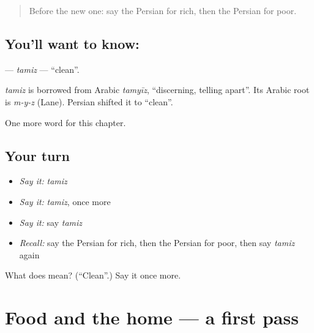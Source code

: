 \label{lesson:FA-C61-tamiz}



\begin{quote}
Before the new one: say the Persian for rich, then the Persian for poor.
\end{quote}

\subsection*{You'll want to know: }
\textbf{} — \emph{tamiz} — \textquotedblleft{}clean\textquotedblright{}.

\begin{cousinweb}
\emph{tamiz} is borrowed from Arabic \emph{tamyīz}, \textquotedblleft{}discerning, telling apart\textquotedblright{}. Its Arabic root is \emph{m-y-z} (Lane). Persian shifted it to \textquotedblleft{}clean\textquotedblright{}.
\end{cousinweb}

\begin{grammarlens}[title={What you've built}]
One more word for this chapter.
\end{grammarlens}

\subsection*{Your turn}
\begin{itemize}
\raggedright
  \item \emph{Say it:} \emph{tamiz}
  \item \emph{Say it:} \emph{tamiz}, once more
  \item \emph{Say it:} say \emph{tamiz}
  \item \emph{Recall:} say the Persian for rich, then the Persian for poor, then say \emph{tamiz} again
\end{itemize}

\begin{tcolorbox}[breakable,colback=teal!4,colframe=teal!35!black,title={Before you move on}]
What does  mean? (\textquotedblleft{}Clean\textquotedblright{}.) Say it once more.
\end{tcolorbox}
\section[(dialogue)]{Food and the home — a first pass}

\label{lesson:FA-R61-first-pass-food-and-the-home}



